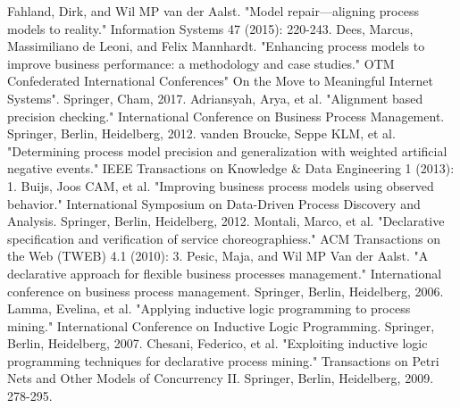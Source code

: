 \documentclass[12pt, a4paper]{article}
\begin{document}
\begin{thebibliography}{9}
 Fahland, Dirk, and Wil MP van der Aalst. "Model repair—aligning process models to reality." Information Systems 47 (2015): 220-243.
 Dees, Marcus, Massimiliano de Leoni, and Felix Mannhardt. "Enhancing process models to improve business performance: a methodology and case studies." OTM Confederated International Conferences" On the Move to Meaningful Internet Systems". Springer, Cham, 2017.
 Adriansyah, Arya, et al. "Alignment based precision checking." International Conference on Business Process Management. Springer, Berlin, Heidelberg, 2012.
 vanden Broucke, Seppe KLM, et al. "Determining process model precision and generalization with weighted artificial negative events." IEEE Transactions on Knowledge \& Data Engineering 1 (2013): 1.
Buijs, Joos CAM, et al. "Improving business process models using observed behavior." International Symposium on Data-Driven Process Discovery and Analysis. Springer, Berlin, Heidelberg, 2012.
 Montali, Marco, et al. "Declarative specification and verification of service choreographiess." ACM Transactions on the Web (TWEB) 4.1 (2010): 3.
 Pesic, Maja, and Wil MP Van der Aalst. "A declarative approach for flexible business processes management." International conference on business process management. Springer, Berlin, Heidelberg, 2006.
 Lamma, Evelina, et al. "Applying inductive logic programming to process mining." International Conference on Inductive Logic Programming. Springer, Berlin, Heidelberg, 2007.
 Chesani, Federico, et al. "Exploiting inductive logic programming techniques for declarative process mining." Transactions on Petri Nets and Other Models of Concurrency II. Springer, Berlin, Heidelberg, 2009. 278-295.
\end{thebibliography}
\end{document}
